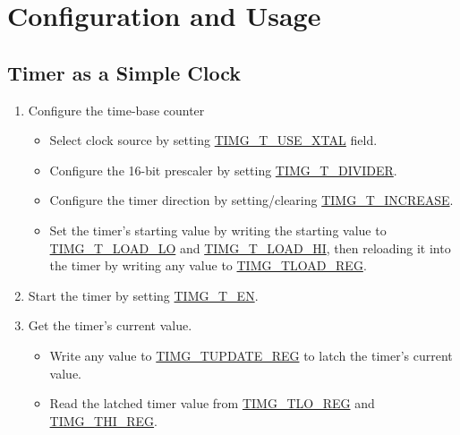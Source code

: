 \documentclass[main\_\_EN.tex]{subfiles}
\begin{document}
\section{Configuration and Usage}
\subsection{Timer as a Simple Clock}\label{simple_clock}
\begin{enumerate}
    \item Configure the time-base counter
    \begin{itemize}
        \item Select clock source by setting \hyperref[fielddesc:TIMGTXUSEXTAL]{TIMG\_T\_USE\_XTAL} field.
        \item Configure the 16-bit prescaler by setting \hyperref[fielddesc:TIMGTXDIVIDER]{TIMG\_T\_DIVIDER}.
        \item Configure the timer direction by setting/clearing \hyperref[fielddesc:TIMGTXINCREASE]{TIMG\_T\_INCREASE}.
        \item Set the timer's starting value by writing the starting value to \hyperref[fielddesc:TIMGTXLOADLO]{TIMG\_T\_LOAD\_LO} and \hyperref[fielddesc:TIMGTXLOADHI]{TIMG\_T\_LOAD\_HI}, then reloading it into the timer by writing any value to \hyperref[regdesc:TIMGTXLOADREG]{TIMG\_TLOAD\_REG}.
    \end{itemize}
    \item Start the timer by setting \hyperref[fielddesc:TIMGTXEN]{TIMG\_T\_EN}.
    \item Get the timer's current value.
    \begin{itemize}
        \item  Write any value to \hyperref[regdesc:TIMGTXUPDATEREG]{TIMG\_TUPDATE\_REG} to latch the timer's current value.
        \item  Read the latched timer value from \hyperref[regdesc:TIMGTXLOREG]{TIMG\_TLO\_REG} and \hyperref[regdesc:TIMGTXHIREG]{TIMG\_THI\_REG}.
    \end{itemize}
\end{enumerate}
\end{document}
